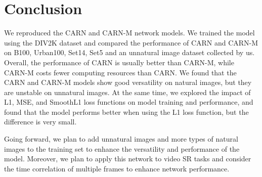 \documentclass[final]{cvpr}
\begin{document}
\section{Conclusion}

We reproduced the CARN and CARN-M network models. We trained the model using the DIV2K dataset and compared the performance of CARN and CARN-M on B100, Urban100, Set14, Set5 and an unnatural image dataset collected by us. Overall, the performance of CARN is usually better than CARN-M, while CARN-M costs fewer computing resources than CARN. We found that the CARN and CARN-M models show good versatility on natural images, but they are unstable on unnatural images. At the same time, we explored the impact of L1, MSE, and SmoothL1 loss functions on model training and performance, and found that the model performs better when using the L1 loss function, but the difference is very small.  

Going forward, we plan to add unnatural images and more types of natural images to the training set to enhance the versatility and performance of the model. Moreover, we plan to apply this network to video SR tasks and consider the time correlation of multiple frames to enhance network performance. 





\end{document}
